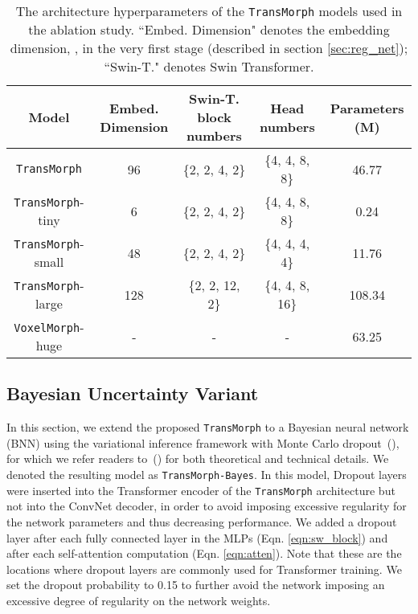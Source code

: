 \documentclass[times,twocolumn,final]{elsarticle}
\begin{document}
\begin{table*}[!ht]
\centering
\caption{The architecture hyperparameters of the \texttt{TransMorph} models used in the ablation study. ``Embed. Dimension" denotes the embedding dimension, , in the very first stage (described in section \ref{sec:reg_net}); ``Swin-T." denotes Swin Transformer.}
\begin{tabular}{ c | c  c  c  c}
 \hline
 Model & Embed. Dimension  & Swin-T. block numbers  & Head numbers & Parameters (M)\\
 \hline
 \texttt{TransMorph} & 96 & \{2, 2, 4, 2\} & \{4, 4, 8, 8\} & 46.77\\
 \hline
 \texttt{TransMorph}-tiny & 6 & \{2, 2, 4, 2\} & \{4, 4, 8, 8\} & 0.24\\
 \hline
 \texttt{TransMorph}-small & 48 & \{2, 2, 4, 2\} & \{4, 4, 4, 4\} & 11.76\\
 \hline
 \texttt{TransMorph}-large & 128 & \{2, 2, 12, 2\} & \{4, 4, 8, 16\} & 108.34\\
 \hline
 \texttt{VoxelMorph}-huge & - & - & - & 63.25\\
 \hline
\end{tabular}
\label{table: TransMorph_sz_ablation}
\end{table*}
\subsection{Bayesian Uncertainty Variant}
\label{sec:bayes_variant}
In this section, we extend the proposed \texttt{TransMorph} to a Bayesian neural network (BNN) using the variational inference framework with Monte Carlo dropout~(\cite{gal2016dropout}), for which we refer readers to~(\cite{gal2016dropout, yang2017fast, yang2016fast}) for both theoretical and technical details. We denoted the resulting model as \texttt{TransMorph-Bayes}. In this model, Dropout layers were inserted into the Transformer encoder of the \texttt{TransMorph} architecture but not into the ConvNet decoder, in order to avoid imposing excessive regularity for the network parameters and thus decreasing performance. We added a dropout layer after each fully connected layer in the MLPs (Eqn. \ref{eqn:sw_block}) and after each self-attention computation (Eqn. \ref{eqn:atten}). Note that these are the locations where dropout layers are commonly used for Transformer training. We set the dropout probability  to 0.15 to further avoid the network imposing an excessive degree of regularity on the network weights.
\end{document}
